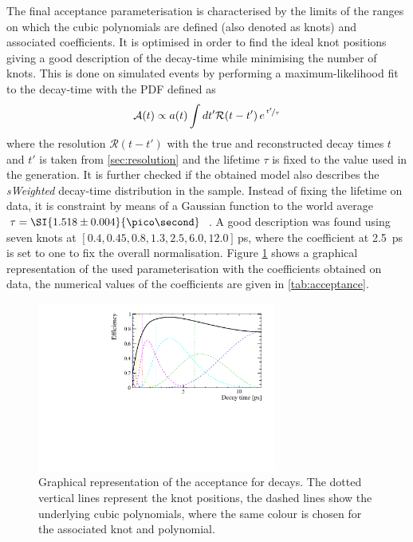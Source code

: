 The final acceptance parameterisation is characterised by the limits of the ranges on which the cubic polynomials are defined (also denoted as knots) and associated coefficients.
It is optimised in order to find the ideal knot positions giving a good description of the decay-time while minimising the number of knots.
This is done on simulated \BdToDpi events by performing a maximum-likelihood fit to the decay-time with the PDF defined as
\begin{equation}
\mathcal{A}(t)\propto a(t)\int dt' \mathcal{R}\!\left(t-t'\right)e^{\,\nicefrac{t'}{\tau}}
\end{equation}
where the resolution $\mathcal{R}\!\left(t-t'\right)$ with the true and reconstructed decay times $t$ and $t'$ is taken from \cref{sec:resolution} and the lifetime $\tau$ is fixed to the value used in the generation.
It is further checked if the obtained model also describes the \emph{sWeighted} decay-time distribution in the \BdToDpi sample.
Instead of fixing the lifetime on data, it is constraint by means of a Gaussian function to the world average $\tau=\SI{1.518\pm0.004}{\pico\second}$~\cite{PDG2018}.
A good description was found using seven knots at $[0.4, 0.45, 0.8, 1.3, 2.5, 6.0, 12.0]\,$\si{\pico\second}, where the coefficient at \SI{2.5}{\pico\second} is set to one to fix the overall normalisation.
Figure \ref{fig:acceptance} shows a graphical representation of the used parameterisation with the coefficients obtained on \BdToDpi data, the numerical values of the coefficients are given in \cref{tab:acceptance}.
\begin{figure}[tbp]
    \centering
    \includegraphics[width=0.7\textwidth]{10TimeFit/figs/Acceptance.pdf}
    \caption{Graphical representation of the acceptance for \BdToDpi decays.
    The dotted vertical lines represent the knot positions, the dashed lines show the underlying cubic polynomials, where the same colour is chosen for the associated knot and polynomial.}
    \label{fig:acceptance}
\end{figure}
